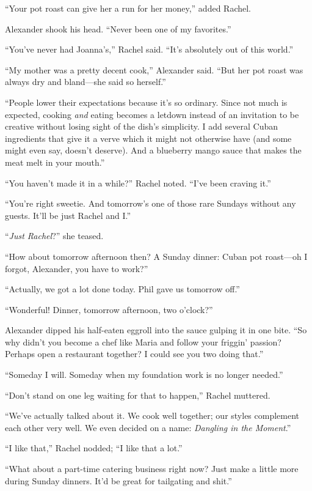 ``Your pot roast can give her a run for her money,'' added Rachel.

Alexander shook his head. ``Never been one of my favorites.''

``You've never had Joanna's,'' Rachel said. ``It's absolutely out of
this world.''

``My mother was a pretty decent cook,'' Alexander said. ``But her pot
roast was always dry and bland---she said so herself.''

``People lower their expectations because it's so ordinary. Since not
much is expected, cooking \emph{and} eating becomes a letdown instead of
an invitation to be creative without losing sight of the dish's
simplicity. I add several Cuban ingredients that give it a verve which
it might not otherwise have (and some might even say, doesn't deserve).
And a blueberry mango sauce that makes the meat melt in your mouth.''

``You haven't made it in a while?'' Rachel noted. ``I've been craving
it.''

``You're right sweetie. And tomorrow's one of those rare Sundays without
any guests. It'll be just Rachel and I.''

``\emph{Just Rachel}?'' she teased.

``How about tomorrow afternoon then? A Sunday dinner: Cuban pot
roast---oh I forgot, Alexander, you have to work?''

``Actually, we got a lot done today. Phil gave us tomorrow off.''

``Wonderful! Dinner, tomorrow afternoon, two o'clock?''

Alexander dipped his half-eaten eggroll into the sauce gulping it in one
bite. ``So why didn't you become a chef like Maria and follow your
friggin' passion? Perhaps open a restaurant together? I could see you
two doing that.''

``Someday I will. Someday when my foundation work is no longer needed.''

``Don't stand on one leg waiting for that to happen,'' Rachel muttered.

``We've actually talked about it. We cook well together; our styles
complement each other very well. We even decided on a name:
\emph{Dangling in the Moment}.''

``I like that,'' Rachel nodded; ``I like that a lot.''

``What about a part-time catering business right now? Just make a little
more during Sunday dinners. It'd be great for tailgating and shit.''

